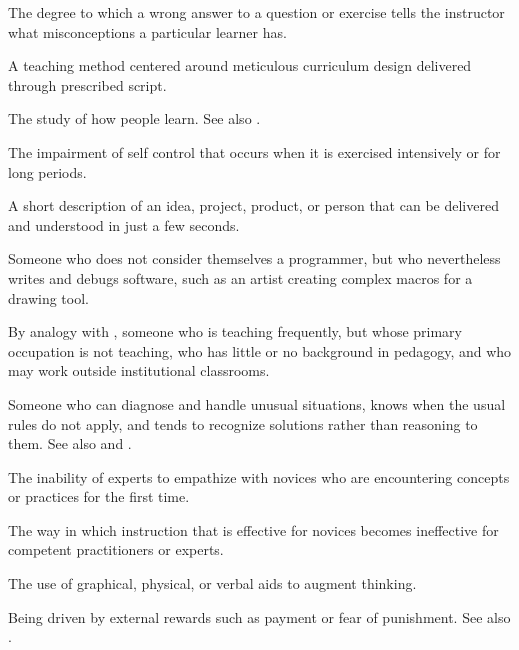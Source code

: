 \begin{description}
 The degree to which a wrong answer
to a question or exercise tells the instructor what misconceptions a particular
learner has.

 A teaching method centered
around meticulous curriculum design delivered through prescribed script.

 The study of how
people learn. See also .

 The impairment of self control that
occurs when it is exercised intensively or for long periods.

 A short description of an idea,
project, product, or person that can be delivered and understood in just a few
seconds.

 Someone who does not
consider themselves a programmer, but who nevertheless writes and debugs
software, such as an artist creating complex macros for a drawing tool.

 By analogy with
,
someone who is teaching frequently, but whose primary occupation is not
teaching, who has little or no background in pedagogy, and who may work outside
institutional classrooms.

 Someone who can diagnose and handle unusual
situations, knows when the usual rules do not apply, and tends to recognize
solutions rather than reasoning to them. See
also 
and .

 The inability of experts to
empathize with novices who are encountering concepts or practices for the first
time.

 The way in which
instruction that is effective for novices becomes ineffective for competent
practitioners or experts.

 The use of graphical,
physical, or verbal aids to augment thinking.

 Being driven by external
rewards such as payment or fear of punishment. See
also .


\end{description}
